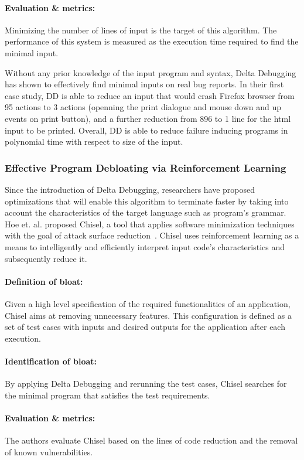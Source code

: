 \paragraph{Evaluation \& metrics:} Minimizing the number of lines of input is the target of this algorithm. The performance of this system is measured as the execution time required to find the minimal input.

Without any prior knowledge of the input program and syntax, Delta Debugging has shown to effectively find minimal inputs on real bug reports. In their first case study, DD is able to reduce an input that would crash Firefox browser from 95 actions to 3 actions (openning the print dialogue and mouse down and up events on print button), and a further reduction from 896 to 1 line for the html input to be printed. Overall, DD is able to reduce failure inducing programs in polynomial time with respect to size of the input.

\subsubsection{Effective Program Debloating via Reinforcement Learning}
Since the introduction of Delta Debugging, researchers have proposed optimizations that will enable this algorithm to terminate faster by taking into account the characteristics of the target language such as program's grammar. Hoe et. al. proposed Chisel, a tool that applies software minimization techniques with the goal of attack surface reduction~\cite{heo2018effective}. Chisel uses reinforcement learning as a means to intelligently and efficiently interpret input code's characteristics and subsequently reduce it. 

\paragraph{Definition of bloat:} Given a high level specification of the required functionalities of an application, Chisel aims at removing unnecessary features. This configuration is defined as a set of test cases with inputs and desired outputs for the application after each execution.
\paragraph{Identification of bloat:} By applying Delta Debugging and rerunning the test cases, Chisel searches for the minimal program that satisfies the test requirements.
\paragraph{Evaluation \& metrics:} The authors evaluate Chisel based on the lines of code reduction and the removal of known vulnerabilities.

